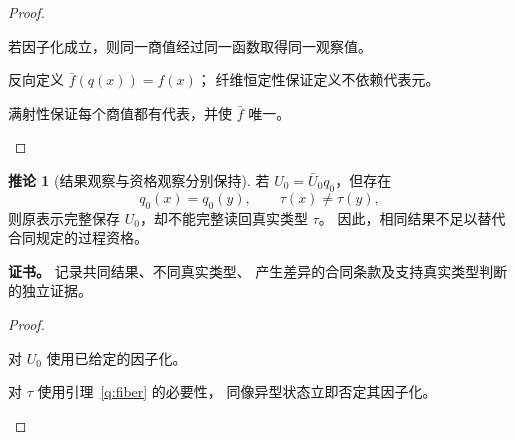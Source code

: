 \documentclass[UTF8,12pt,a4paper,openany,fontset=none,zihao=false]{ctexrep}
\theoremstyle{definition}
\newtheorem{corollary}{推论}[chapter]
\newenvironment{certificate}{\par\noindent\textbf{证书。}\ignorespaces}{\par}
\newcommand{\1}{\mathbf 1}
\begin{document}
\begin{proof}
\begin{semanticsteps}
\item 若因子化成立，则同一商值经过同一函数取得同一观察值。
\item 反向定义 \(\bar f(q(x))=f(x)\)；
纤维恒定性保证定义不依赖代表元。
\item 满射性保证每个商值都有代表，并使 \(\bar f\) 唯一。
\end{semanticsteps}
\end{proof}
\begin{corollary}[结果观察与资格观察分别保持]
\label{q:outcome-type}
若 \(U_0=\bar U_0q_0\)，但存在
\[
q_0(x)=q_0(y),\qquad \tau(x)\ne\tau(y),
\]
则原表示完整保存 \(U_0\)，却不能完整读回真实类型 \(\tau\)。
因此，相同结果不足以替代合同规定的过程资格。
\end{corollary}
\begin{certificate}
记录共同结果、不同真实类型、
产生差异的合同条款及支持真实类型判断的独立证据。
\end{certificate}
\begin{proof}
\begin{semanticsteps}
\item 对 \(U_0\) 使用已给定的因子化。
\item 对 \(\tau\) 使用引理~\ref{q:fiber} 的必要性，
同像异型状态立即否定其因子化。
\end{semanticsteps}
\end{proof}
\end{document}
